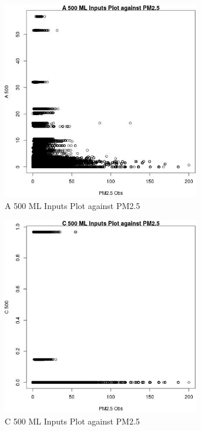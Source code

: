 \begin{figure} 
\centering  
\includegraphics[width=0.77\textwidth]{Code_Outputs/ML_input_report_ML_input_PM25_Step5_part_d_de_duplicated_aves_ML_input_A_500vPM25_Obs.jpg} 
\caption{\label{fig:ML_input_report_ML_input_PM25_Step5_part_d_de_duplicated_aves_ML_inputA_500vPM25_Obs}A 500 ML Inputs Plot against PM2.5} 
\end{figure} 
 

\begin{figure} 
\centering  
\includegraphics[width=0.77\textwidth]{Code_Outputs/ML_input_report_ML_input_PM25_Step5_part_d_de_duplicated_aves_ML_input_C_500vPM25_Obs.jpg} 
\caption{\label{fig:ML_input_report_ML_input_PM25_Step5_part_d_de_duplicated_aves_ML_inputC_500vPM25_Obs}C 500 ML Inputs Plot against PM2.5} 
\end{figure} 
 

